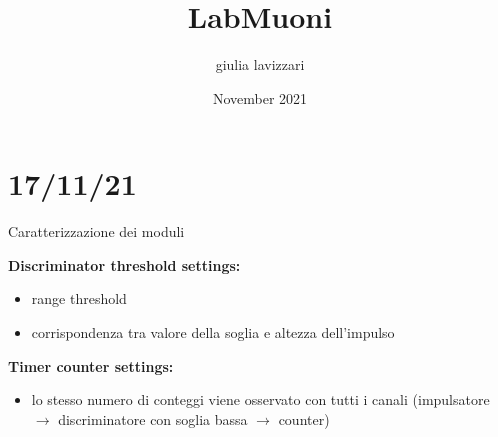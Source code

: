 \documentclass{article}
\title{LabMuoni}
\author{giulia lavizzari}
\date{November 2021}
\begin{document}
\maketitle

\section{17/11/21}
Caratterizzazione dei moduli

\textbf{Discriminator threshold settings:}
\begin{itemize}
    \item range threshold
    \item corrispondenza tra valore della soglia e altezza dell'impulso
\end{itemize}

\textbf{Timer counter settings:}
\begin{itemize}
    \item lo stesso numero di conteggi viene osservato con tutti i canali (impulsatore $\rightarrow$ discriminatore con soglia bassa $\rightarrow$ counter)
\end{itemize}
\end{document}
